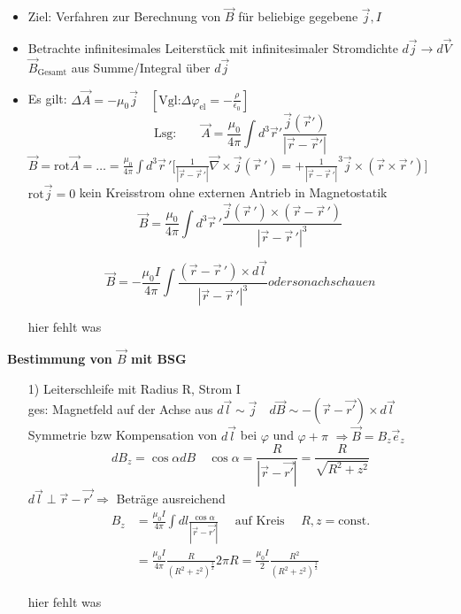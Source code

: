 \documentclass[titlepage,12pt,a4paper,ngerman]{report}
\newcommand{\tx}[1]{\textrm{#1}}
\begin{document}
\begin{itemize}
	\item Ziel: Verfahren zur Berechnung von $ \vec{B} $ für beliebige gegebene $ \vec{j}, I $
	\item  Betrachte infinitesimales Leiterstück mit infinitesimaler Stromdichte $ d\vec{j} \rightarrow d \vec{V} $ \\
	$ \vec{B}_{\tx{Gesamt}} $ aus Summe/Integral über $ d\vec{j} $
	\item Es gilt: $ \Delta \vec{A} = -\mu_0 \vec{j} \quad [\tx{Vgl:} \Delta \varphi_{\tx{el}} = - \frac{\rho}{\epsilon_0}] $ \\
	$$\tx{Lsg:} \qquad  \vec{A} = \frac{ \mu_0}{4 \pi} \int d^3 \vec{r}' \frac{\vec{j} (\vec{r}')}{|\vec{r} - \vec{r}'|} $$
	$ \vec{B}  = \tx{rot} \vec{A} = \dots = \frac{\mu_0}{4 \pi} \int d^3 \vec{r}\,' \Big[ \frac{1}{|\vec{r} - \vec{r}\,'|} \vec{\nabla} \times \vec{j} (\vec{r}\,')= + \frac{1}{|\vec{r} - \vec{r}\,'|}^3 \vec{j} \times (\vec{r} \times \vec{r}\,')\Big] $\\
	$ \tx{rot} \vec{j} = 0 $ kein Kreisstrom ohne externen Antrieb in Magnetostatik
	$$\boxed{\vec{B} = \frac{\mu_0}{4\pi} \int d^3 \vec{r}\,' \frac{\vec{j} (\vec{r}\,') \times (\vec{r} - \vec{r}\,') }{| \vec{r} - \vec{r}\,'| ^3}}$$
	
	
	$$\boxed{\vec{B} = -\frac{\mu_0 I}{4\pi} \int \frac{(\vec{r} - \vec{r}\,') \times d\vec{l} }{| \vec{r} - \vec{r}\,'| ^3}} oder so nachschauen $$
	
	hier fehlt was\\
	
\end{itemize}
\textbf{Bestimmung von $ \vec{B} $ mit BSG}
\begin{itemize}
	\item[1)] Leiterschleife mit Radius R, Strom I\\
	ges: Magnetfeld auf der Achse aus $ d\vec{l} \sim \vec{j} \quad d \vec{B} \sim - (\vec{r} - \vec{r'}) \times d\vec{l} $\\
	Symmetrie bzw Kompensation von $ d\vec{l} $ bei $ \varphi $ und $\varphi + \pi$ $ \Rightarrow \vec{B} = B_z \vec{e}_z $\\
	$$ dB_z = \cos \alpha d B \quad \cos \alpha = \frac{R}{|\vec{r} - \vec{r'}|}  = \frac{R}{\sqrt{R^2 + z^2}}$$
	$ d\vec{l} \perp \vec{r} - \vec{r'} \Rightarrow $ Beträge ausreichend\\
	\begin{align*}
	B_z & = \frac{\mu_0 I }{4 \pi} \int d l \frac{\cos \alpha }{|\vec{r} - \vec{r'}|} \quad \tx{ auf Kreis } \quad R,z = \tx{const.} \\
	& = \frac{\mu_0 I }{4 \pi} \frac{R}{(R^2 + z^2 )^{\frac{3}{2}}} 2 \pi R = \frac{\mu_0 I }{2} \frac{ R^2}{(R^2 + z^2 ) ^{\frac{3}{2}}}
	\end{align*}
	
	hier fehlt was 
	
\end{itemize}
\end{document}
